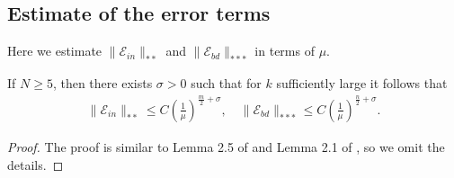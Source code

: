 \documentclass[11pt,a4paper]{amsart}
\begin{document}
\subsection{Estimate of the error terms}
Here we estimate $\|\mathscr E_{in}\|_{**}$ and $\|\mathscr E_{bd}\|_{***}$ in terms of $\mu$.
\begin{lemma}\label{lemma.error_term_estimates}
  If $N\geq5$, then there exists $\sigma >0$ such that for $k$ sufficiently large it follows that
  \begin{align*}
    \|\mathscr E_{in}\|_{**} \leq C\left(\frac{1}{\mu}\right)^{\frac{m}{2}+\sigma}, \quad  \|\mathscr E_{bd}\|_{***} \leq C\left(\frac{1}{\mu}\right)^{\frac{n}{2}+\sigma}.
  \end{align*}
\end{lemma}

\begin{proof}
The proof is similar to Lemma 2.5 of \cite{WeiYan_2010a} and Lemma 2.1 of \cite{WangZhao_2013}, so we omit the details.
\end{proof}
\end{document}

